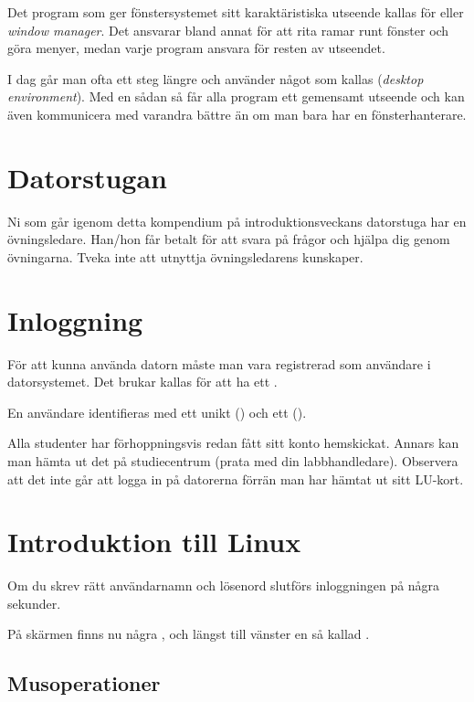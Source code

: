 \documentclass[a4paper,twocolumn]{book}
\begin{document}
Det program som ger fönstersystemet sitt karaktäristiska utseende
kallas för  eller \emph{window manager}. Det
ansvarar bland annat för att rita ramar runt fönster och göra menyer, medan
varje program ansvara för resten av utseendet.

I dag går man ofta ett steg längre och använder något som kallas
 (\emph{desktop environment}). Med en sådan så får
alla program ett gemensamt utseende och kan även kommunicera med varandra
bättre än om man bara har en fönsterhanterare.

\section{Datorstugan}

Ni som går igenom detta kompendium på introduktionsveckans datorstuga
har en övningsledare. Han/hon får betalt för att svara på frågor och
hjälpa dig genom övningarna. Tveka inte att utnyttja övningsledarens
kunskaper. 


\section{Inloggning}

För att kunna använda datorn måste man vara registrerad som användare
i datorsystemet. Det brukar kallas för att ha ett .

En användare identifieras med ett unikt 
() och ett  ().

Alla studenter har förhoppningsvis redan fått sitt konto hemskickat. Annars
kan man hämta ut det på studiecentrum (prata med din labbhandledare). Observera att det inte går att logga in
på datorerna förrän man har hämtat ut sitt LU-kort.


\section{Introduktion till Linux}

Om du skrev rätt användarnamn och lösenord slutförs inloggningen på några
sekunder.

På skärmen finns nu några , och längst till vänster  en så kallad
.


\subsection{Musoperationer} %
\end{document}
